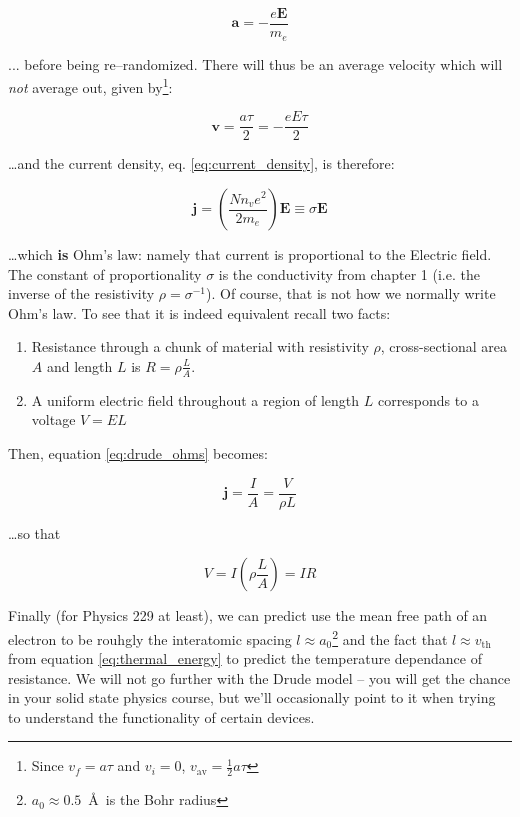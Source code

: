\documentclass{tufte-book}
\begin{document}
\begin{equation}
\label{eq:coulomb_accel}
\textbf{a} = -\frac{e\textbf{E}}{m_e}
\end{equation}

\noindent... before being re--randomized. There will thus be an average velocity which will \textit{not} average out, given by\footnote{Since $v_f = a\tau$ and $v_i = 0$, $v_\text{av} = \frac{1}{2}a\tau$}:

\begin{equation}
\label{eq:drude_avg_velocity}
\textbf{v} = \frac{a\tau}{2} = -\frac{eE\tau}{2}
\end{equation}

\noindent\ldots and the current density, eq. \ref{eq:current_density}, is therefore:

\begin{equation}
\label{eq:drude_ohms}
\textbf{j} = \left(\frac{Nn_ve^2}{2m_e}\right)\textbf{E} \equiv \sigma\textbf{E}
\end{equation}

\noindent\ldots which \textbf{is} Ohm's law: namely that current is proportional to the Electric field. The constant of proportionality $\sigma$ is the conductivity from chapter 1 (i.e. the inverse of the resistivity $\rho = \sigma^{-1}$). Of course, that is not how we normally write Ohm's law. To see that it is indeed equivalent recall two facts: 
\begin{enumerate}
  \item Resistance through a chunk of material with resistivity $\rho$, cross-sectional area $A$ and length $L$ is $R = \rho\frac{L}{A}$.
  \item A uniform electric field throughout a region of length $L$ corresponds to a voltage $V = EL$
\end{enumerate}

Then, equation \ref{eq:drude_ohms} becomes:

$$
\textbf{j} = \frac{I}{A} = \frac{V}{\rho L}
$$

\noindent \ldots so that 

\begin{equation}
\label{eq:drude_ohms2}
V = I\left(\rho\frac{L}{A}\right) = IR
\end{equation}

Finally (for Physics 229 at least), we can predict use the mean free path of an electron to be rouhgly the interatomic spacing $l\approx a_0$\footnote{$a_0 \approx 0.5$~\AA~is the Bohr radius} and the fact that $l \approx v_\text{th}$ from equation \ref{eq:thermal_energy} to predict the temperature dependance of resistance. We will not go further with the Drude model -- you will get the chance in your solid state physics course, but we'll occasionally point to it when trying to understand the functionality of certain devices.
\end{document}
